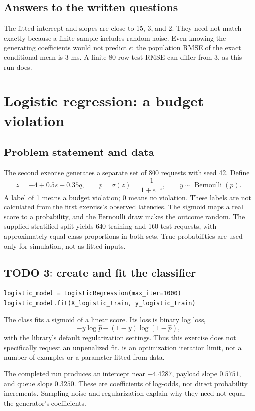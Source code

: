 \subsection{Answers to the written questions}
The fitted intercept and slopes are close to 15, 3, and 2. They need not match exactly because a finite sample includes random noise. Even knowing the generating coefficients would not predict $\epsilon$; the population RMSE of the exact conditional mean is 3 ms. A finite 80-row test RMSE can differ from 3, as this run does.

\section{Logistic regression: a budget violation}
\subsection{Problem statement and data}
The second exercise generates a separate set of 800 requests with seed 42. Define
\[z=-4+0.5s+0.35q,\qquad p=\sigma(z)=\frac1{1+e^{-z}},\qquad y\sim\operatorname{Bernoulli}(p).\]
A label of 1 means a budget violation; 0 means no violation. These labels are not calculated from the first exercise's observed latencies. The sigmoid maps a real score to a probability, and the Bernoulli draw makes the outcome random.
The supplied stratified split yields 640 training and 160 test requests, with approximately equal class proportions in both sets. True probabilities are used only for simulation, not as fitted inputs.

\subsection{TODO 3: create and fit the classifier}
\begin{lstlisting}
logistic_model = LogisticRegression(max_iter=1000)
logistic_model.fit(X_logistic_train, y_logistic_train)
\end{lstlisting}
The class fits a sigmoid of a linear score. Its loss is binary log loss,
\[-y\log\hat p-(1-y)\log(1-\hat p),\]
with the library's default regularization settings. Thus this exercise does not specifically request an unpenalized fit.  is an optimization iteration limit, not a number of examples or a parameter fitted from data.

The completed run produces an intercept near $-4.4287$, payload slope $0.5751$, and queue slope $0.3250$. These are coefficients of log-odds, not direct probability increments. Sampling noise and regularization explain why they need not equal the generator's coefficients.

